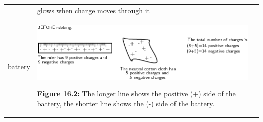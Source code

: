\begin{center}
\begin{xtabular*}{\mytablewidth}[t]{|p{10\mystarwidth}|p{10\mystarwidth}|p{10\mystarwidth}|}
\begin{center}
      \vspace{2pt}
    \vspace{.1in}
    
    \end{center}



    \addtocounter{footnote}{-0}
    
                   &
    
    
        glows when charge moves through it%
     \tabularnewline{}
    
    
        battery &
    
    
        
                    
    \setcounter{subfigure}{0}

\label{m38771*id62930}
    \begin{center}
    \label{m38771*id62930!!!underscore!!!media}\label{m38771*id62930!!!underscore!!!printimage}\includegraphics{col11305.imgs/m38771_PG10C9_002.png} %
        
      \vspace{2pt}
    \vspace{\rubberspace}\par \begin{cnxcaption}
	  \small \textbf{Figure 16.2: }The longer line shows the positive (+) side of the battery, the shorter line shows the (-) side of the battery.
	\end{cnxcaption}
      

\end{center}
\end{xtabular*}
\end{center}
